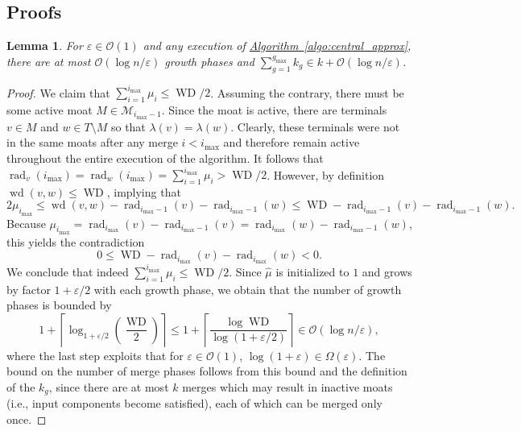 \documentclass[letterpaper,11pt]{article}
\newtheorem{lemma}[theorem]{Lemma}
\newcommand{\namedref}[2]{\hyperref[#2]{#1~\ref*{#2}}}
\newcommand{\algref}[1]{\namedref{Algorithm}{#1}}
\newcommand{\BO}{\mathcal{O}}
\newcommand{\M}{\mathcal{M}}
\newcommand{\Comp}{\lambda}
\DeclareMathOperator{\moat}{rad}
\DeclareMathOperator{\Wd}{wd}
\DeclareMathOperator{\WD}{WD}
\begin{document}
\subsection{Proofs}
\label{app:sublinear-analysis}
\begin{lemma}\label{lemma:number_merge_growth_phase}
For $\varepsilon\in \BO(1)$ and any execution of \algref{algo:central_approx},
there are at most $\BO(\log n/\varepsilon)$ growth phases and
$\sum_{g=1}^{g_{\max}}k_g\in k+\BO(\log n/\varepsilon)$.
\end{lemma}
\begin{proof}We claim that $\sum_{i=1}^{i_{\max}}\mu_i\leq \WD/2$. Assuming the
contrary, there must be some active moat $M\in \M_{i_{\max}-1}$. Since the moat
is active, there are terminals $v\in M$ and $w\in T\setminus M$ so that
$\Comp(v)=\Comp(w)$. Clearly, these terminals were not in the same moats after
any merge $i<i_{\max}$ and therefore remain active throughout the entire
execution of the algorithm. It follows that
$\moat_v(i_{\max})=\moat_w(i_{\max})=\sum_{i=1}^{i_{\max}}\mu_i> \WD/2$.
However, by definition $\Wd(v,w)\leq \WD$, implying that
\begin{equation*}
2\mu_{i_{\max}}\leq \Wd(v,w)-\moat_{i_{\max}-1}(v)-\moat_{i_{\max}-1}(w)
\leq \WD-\moat_{i_{\max}-1}(v)-\moat_{i_{\max}-1}(w).
\end{equation*}
Because $\mu_{i_{\max}}=\moat_{i_{\max}}(v)-\moat_{i_{\max}-1}(v)
=\moat_{i_{\max}}(w)-\moat_{i_{\max}-1}(w)$, this yields the contradiction
\begin{equation*}
0\leq \WD-\moat_{i_{\max}}(v)-\moat_{i_{\max}}(w)<0.
\end{equation*}
We conclude that indeed $\sum_{i=1}^{i_{\max}}\mu_i\leq \WD/2$. Since
$\hat{\mu}$ is initialized to $1$ and grows by factor $1+\varepsilon/2$ with
each growth phase, we obtain that the number of growth phases is bounded by
\begin{equation*}
1+\left\lceil \log_{1+\varepsilon/2}\left(\frac{\WD}{2}\right)\right\rceil
\leq 1+\left\lceil\frac{\log \WD}{\log(1+\varepsilon/2)}\right\rceil
\in \BO(\log n /\varepsilon),
\end{equation*}
where the last step exploits that for $\varepsilon\in \BO(1)$,
$\log(1+\varepsilon)\in \Omega(\varepsilon)$. The bound on the number of merge
phases follows from this bound and the definition of the $k_g$, since there are
at most $k$ merges which may result in inactive moats (i.e., input components
become satisfied), each of which can be merged only once.
\end{proof}
\end{document}
